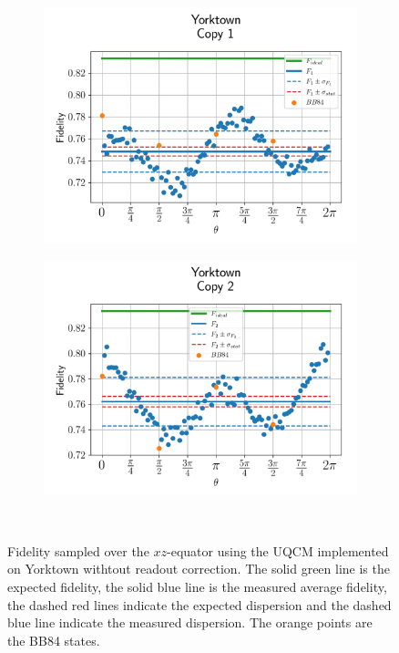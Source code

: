 \begin{figure}[H]
    \centering
    \begin{subfigure}{.45\textwidth}
      \centering
      \includegraphics[width=\textwidth]{Figures/UQCM/IBM/OnlyEquator/results_ibmqx2_copy1.png}
    \end{subfigure}%
    \begin{subfigure}{.45\textwidth}
      \centering
      \includegraphics[width=\textwidth]{Figures/UQCM/IBM/OnlyEquator/results_ibmqx2_copy2.png}
    \end{subfigure}
    \caption{Fidelity sampled over the $xz$-equator using the UQCM implemented on Yorktown withtout readout correction. The solid green line is the expected fidelity, the solid blue line is the measured average fidelity, the dashed red lines indicate the expected dispersion and the dashed blue line indicate the measured dispersion. The orange points are the BB84 states.}
    \
\end{figure}



